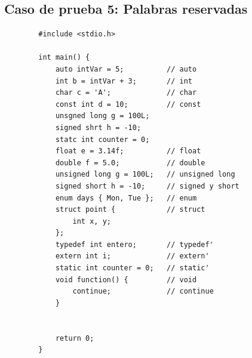 \documentclass[a4paper,12pt]{article}
\begin{document}
\subsection*{Caso de prueba 5: Palabras reservadas}
\begin{flushleft}
	\begin{verbatim}
		#include <stdio.h>
		
		int main() {
			auto intVar = 5;          // auto
			int b = intVar + 3;       // int
			char c = 'A';             // char
			const int d = 10;         // const
			unsgned long g = 100L;   
			signed shrt h = -10;      
			statc int counter = 0;    
			float e = 3.14f;          // float
			double f = 5.0;           // double
			unsigned long g = 100L;   // unsigned long
			signed short h = -10;     // signed y short
			enum days { Mon, Tue };   // enum
			struct point {            // struct
				int x, y;
			};
			typedef int entero;       // typedef'
			extern int i;             // extern'
			static int counter = 0;   // static'
			void function() {         // void
				continue;             // continue
			}
			
			
			return 0;
		}
	\end{verbatim}


\end{flushleft}
\end{document}
